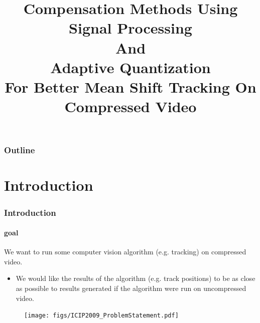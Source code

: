 
\title{Compensation Methods Using \\Signal Processing \\And \\Adaptive Quantization \\For Better Mean Shift Tracking On Compressed Video}
\begin{frame}[plain]\logoTechTower
	\titlepage
\end{frame}


\begin{frame}\frametitle{Outline}\logoTechTower\logoCSIPCPL\mypagenum
	\tableofcontents
\end{frame}




\section{Introduction}
\begin{frame}
\frametitle{Introduction}
\framesubtitle{goal}
\logoCSIPCPL\mypagenum
	We want to run some computer vision algorithm (e.g. tracking) on compressed video.
	\begin{itemize}
		\item We would like the results of the algorithm (e.g. track positions) to be as close as possible to results generated if the algorithm were run on uncompressed video.
	\end{itemize}
	\begin{figure}		
		\texttt{[image: figs/ICIP2009\_ProblemStatement.pdf]}
	\end{figure}
\end{frame}




